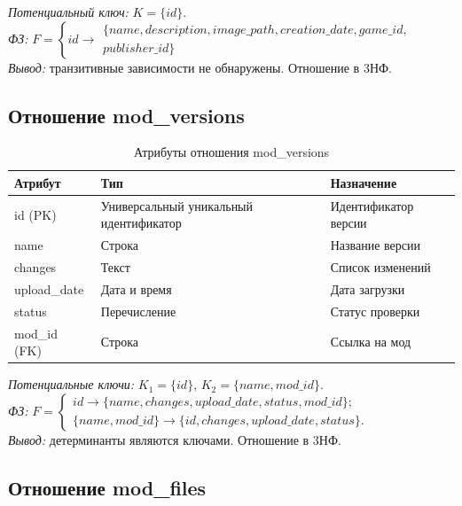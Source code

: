 \textit{Потенциальный ключ:} $K = \{id\}$. \\
\textit{ФЗ:} $F = \left\{ id \rightarrow \begin{array}{l}
	\{name, description, image\_path, creation\_date, game\_id, \\
	publisher\_id\}
\end{array} \right.$ \\
\textit{Вывод:} транзитивные зависимости не обнаружены. Отношение в 3НФ.

\subsection*{Отношение mod\_versions}

\begin{table}[H]
	\centering
	\caption{Атрибуты отношения mod\_versions}
	\label{tab:mod_versions}
	\begin{tabularx}{\textwidth}{|l|X|X|}
		\hline
		\textbf{Атрибут} & \textbf{Тип} & \textbf{Назначение} \\
		\hline
		id (PK) & Универсальный уникальный идентификатор & Идентификатор версии \\
		\hline
		name & Строка & Название версии \\
		\hline
		changes & Текст & Список изменений \\
		\hline
		upload\_date & Дата и время & Дата загрузки \\
		\hline
		status & Перечисление & Статус проверки \\
		\hline
		mod\_id (FK) & Строка & Ссылка на мод \\
		\hline
	\end{tabularx}
\end{table}

\textit{Потенциальные ключи:} $K_1 = \{id\}$, $K_2 = \{name, mod\_id\}$. \\
\textit{ФЗ:} $F = \left\{ \begin{array}{l}
	id \rightarrow \{name, changes, upload\_date, status, mod\_id\}; \\
	\{name, mod\_id\} \rightarrow \{id, changes, upload\_date, status\}.
\end{array} \right.$ \\
\textit{Вывод:} детерминанты являются ключами. Отношение в 3НФ.

\subsection*{Отношение mod\_files}

